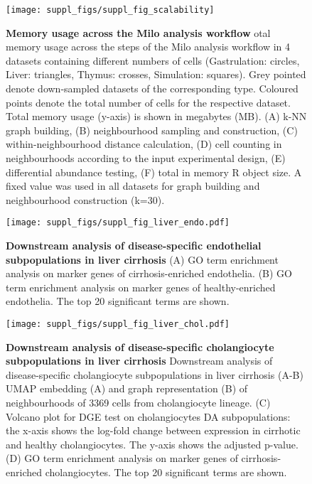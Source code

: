 \documentclass[
]{article}
\begin{document}
\begin{figure}[ht]
\texttt{[image: suppl\_figs/suppl\_fig\_scalability]} \caption{\textbf{Memory usage across the Milo analysis workflow}
otal memory usage across the steps of the Milo analysis workflow in 4 datasets containing different numbers of cells (Gastrulation: circles, Liver: triangles, Thymus: crosses, Simulation: squares). Grey pointed denote down-sampled datasets of the corresponding type. Coloured points denote the total number of cells for the respective dataset. Total memory usage (y-axis) is shown in megabytes (MB). (A) k-NN graph building, (B) neighbourhood sampling and construction, (C) within-neighbourhood distance calculation, (D) cell counting in neighbourhoods according to the input experimental design, (E) differential abundance testing, (F) total in memory R object size. A fixed value was used in all datasets for graph building and neighbourhood construction (k=30).}\label{fig:sup-fig-scalability}
\end{figure}




\begin{figure}
\centering
\texttt{[image: suppl\_figs/suppl\_fig\_liver\_endo.pdf]}
\caption{\label{fig:sup-fig-liver-endo}\textbf{Downstream analysis of disease-specific endothelial subpopulations in liver cirrhosis}
(A) GO term enrichment analysis on marker genes of cirrhosis-enriched endothelia. (B) GO term enrichment analysis on marker genes of healthy-enriched endothelia. The top 20 significant terms are shown.}
\end{figure}




\begin{figure}
\centering
\texttt{[image: suppl\_figs/suppl\_fig\_liver\_chol.pdf]}
\caption{\label{fig:sup-fig-liver-chol}\textbf{Downstream analysis of disease-specific cholangiocyte subpopulations in liver cirrhosis}
Downstream analysis of disease-specific cholangiocyte subpopulations in liver cirrhosis
(A-B) UMAP embedding (A) and graph representation (B) of neighbourhoods of 3369 cells from cholangiocyte lineage.
(C) Volcano plot for DGE test on cholangiocytes DA subpopulations: the x-axis shows the log-fold change between expression in cirrhotic and healthy cholangiocytes. The y-axis shows the adjusted p-value.
(D) GO term enrichment analysis on marker genes of cirrhosis-enriched cholangiocytes. The top 20 significant terms are shown.}
\end{figure}
\end{document}
